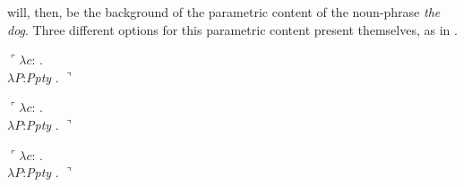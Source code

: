\preveg{} will, then, be the background of the
parametric content of the noun-phrase \textit{the dog}. Three
different options for this parametric content present themselves, as
in \nexteg{}.
\begin{ex} 
\begin{subex} 
 
\item $\ulcorner\lambda
  c$: . \\
\hspace*{2em}$\lambda P$:\textit{Ppty} .
$\urcorner$ 
 
\item $\ulcorner\lambda
  c$: . \\
\hspace*{2em}$\lambda P$:\textit{Ppty} .
$\urcorner$ 

\item $\ulcorner\lambda
  c$: . \\
\hspace*{2em}$\lambda P$:\textit{Ppty} .
$\urcorner$  
 
\end{subex} 
\label{ex:threethes}   
\end{ex}

 

